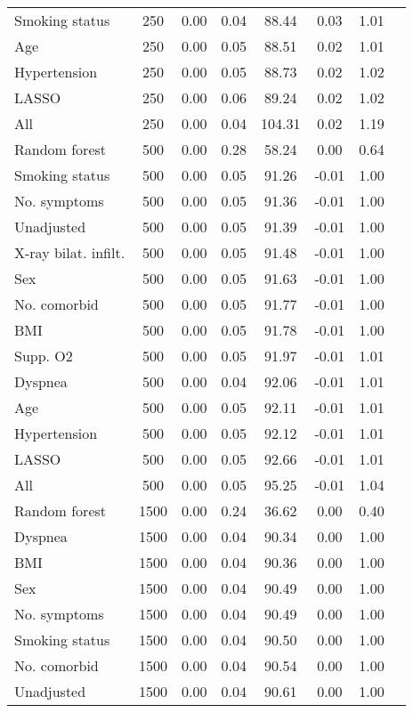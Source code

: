 \documentclass{article}
\begin{document}
{\begin{longtable}{lccccccc}
Smoking status & 250 & 0.00 & 0.04 &  88.44 &  0.03 & 1.01 \\ 
Age & 250 & 0.00 & 0.05 &  88.51 &  0.02 & 1.01 \\ 
Hypertension & 250 & 0.00 & 0.05 &  88.73 &  0.02 & 1.02 \\ 
LASSO & 250 & 0.00 & 0.06 &  89.24 &  0.02 & 1.02 \\ 
All & 250 & 0.00 & 0.04 & 104.31 &  0.02 & 1.19 \\ \midrule() 
Random forest & 500 & 0.00 & 0.28 &  58.24 &  0.00 & 0.64 \\ 
Smoking status & 500 & 0.00 & 0.05 &  91.26 & -0.01 & 1.00 \\ 
No. symptoms & 500 & 0.00 & 0.05 &  91.36 & -0.01 & 1.00 \\ 
Unadjusted & 500 & 0.00 & 0.05 &  91.39 & -0.01 & 1.00 \\ 
X-ray bilat. infilt. & 500 & 0.00 & 0.05 &  91.48 & -0.01 & 1.00 \\ 
Sex & 500 & 0.00 & 0.05 &  91.63 & -0.01 & 1.00 \\ 
No. comorbid & 500 & 0.00 & 0.05 &  91.77 & -0.01 & 1.00 \\ 
BMI & 500 & 0.00 & 0.05 &  91.78 & -0.01 & 1.00 \\ 
Supp. O2 & 500 & 0.00 & 0.05 &  91.97 & -0.01 & 1.01 \\ 
Dyspnea & 500 & 0.00 & 0.04 &  92.06 & -0.01 & 1.01 \\ 
Age & 500 & 0.00 & 0.05 &  92.11 & -0.01 & 1.01 \\ 
Hypertension & 500 & 0.00 & 0.05 &  92.12 & -0.01 & 1.01 \\ 
LASSO & 500 & 0.00 & 0.05 &  92.66 & -0.01 & 1.01 \\ 
All & 500 & 0.00 & 0.05 &  95.25 & -0.01 & 1.04 \\ \midrule() 
Random forest & 1500 & 0.00 & 0.24 &  36.62 &  0.00 & 0.40 \\ 
Dyspnea & 1500 & 0.00 & 0.04 &  90.34 &  0.00 & 1.00 \\ 
BMI & 1500 & 0.00 & 0.04 &  90.36 &  0.00 & 1.00 \\ 
Sex & 1500 & 0.00 & 0.04 &  90.49 &  0.00 & 1.00 \\ 
No. symptoms & 1500 & 0.00 & 0.04 &  90.49 &  0.00 & 1.00 \\ 
Smoking status & 1500 & 0.00 & 0.04 &  90.50 &  0.00 & 1.00 \\ 
No. comorbid & 1500 & 0.00 & 0.04 &  90.54 &  0.00 & 1.00 \\ 
Unadjusted & 1500 & 0.00 & 0.04 &  90.61 &  0.00 & 1.00 \\ 

\end{longtable}}
\end{document}
